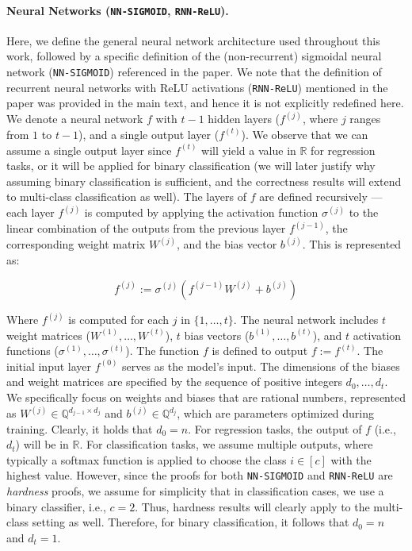 \paragraph{Neural Networks (\texttt{NN-SIGMOID}, \texttt{RNN-ReLU}).} 
Here, we define the general neural network architecture used throughout this work, followed by a specific definition of the (non-recurrent) sigmoidal neural network (\texttt{NN-SIGMOID}) referenced in the paper. We note that the definition of recurrent neural networks with ReLU activations (\texttt{RNN-ReLU}) mentioned in the paper was provided in the main text, and hence it is not explicitly redefined here. We denote a neural network $f$ with $t-1$ hidden layers ($f^{(j)}$, where $j$ ranges from $1$ to $t-1$), and a single output layer ($f^{(t)}$). We observe that we can assume a single output layer since $f^{(t)}$ will yield a value in $\mathbb{R}$ for regression tasks, or it will be applied for binary classification (we will later justify why assuming binary classification is sufficient, and the correctness results will extend to multi-class classification as well). The layers of $f$ are defined recursively — each layer $f^{(j)}$ is computed by applying the activation function $\sigma^{(j)}$ to the linear combination of the outputs from the previous layer $f^{(j-1)}$, the corresponding weight matrix $W^{(j)}$, and the bias vector $b^{(j)}$. This is represented as:

\begin{equation}
    f^{(j)} := \sigma^{(j)}(f^{(j-1)}W^{(j)} + b^{(j)})
\end{equation}

Where $f^{(j)}$ is computed for each $j$ in $\{1,\ldots,t\}$. The neural network includes $t$ weight matrices ($W^{(1)},\ldots,W^{(t)}$), $t$ bias vectors ($b^{(1)},\ldots,b^{(t)}$), and $t$ activation functions ($\sigma^{(1)},\ldots,\sigma^{(t)}$). The function $f$ is defined to output $f := f^{(t)}$. The initial input layer $f^{(0)}$ serves as the model's input. The dimensions of the biases and weight matrices are specified by the sequence of positive integers ${d_{0}, \ldots, d_{t}}$. We specifically focus on weights and biases that are rational numbers, represented as $W^{(j)}\in \mathbb{Q}^{d_{j-1}\times d_{j}}$ and $b^{(j)}\in \mathbb{Q}^{d_{j}}$, which are parameters optimized during training. Clearly, it holds that $d_0=n$. For regression tasks, the output of $f$ (i.e., $d_t$) will be in $\mathbb{R}$. For classification tasks, we assume multiple outputs, where typically a softmax function is applied to choose the class $i\in[c]$ with the highest value. However, since the proofs for both \texttt{NN-SIGMOID} and \texttt{RNN-ReLU} are \emph{hardness} proofs, we assume for simplicity that in classification cases, we use a binary classifier, i.e., $c=2$. Thus, hardness results will clearly apply to the multi-class setting as well. Therefore, for binary classification, it follows that $d_{0} = n$ and $d_{t} = 1$.

